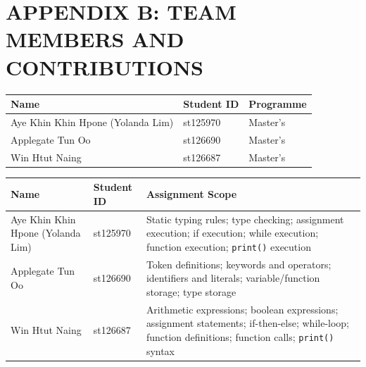 \chapter*{APPENDIX B: TEAM MEMBERS AND CONTRIBUTIONS}

\vspace{1cm}

\begin{table}[h!]
\centering
\renewcommand{\arraystretch}{1.5}
\begin{tabular}{@{} l l l @{}}
\toprule
\textbf{Name} & \textbf{Student ID} & \textbf{Programme} \\
\midrule
Aye Khin Khin Hpone (Yolanda Lim) & st125970 & Master's \\
Applegate Tun Oo                   & st126690 & Master's \\
Win Htut Naing                     & st126687 & Master's \\
\bottomrule
\end{tabular}
\end{table}

\vspace{1cm}

\begin{table}[h!]
\centering
\renewcommand{\arraystretch}{1.5}
\small
\begin{tabular}{@{} p{3.8cm} p{1.8cm} p{8.0cm} @{}}
\toprule
\textbf{Name} & \textbf{Student ID} & \textbf{Assignment Scope} \\
\midrule
Aye Khin Khin Hpone (Yolanda Lim) & st125970 & Static typing rules; type checking; assignment execution; if execution; while execution; function execution; \texttt{print()} execution \\
Applegate Tun Oo & st126690 & Token definitions; keywords and operators; identifiers and literals; variable/function storage; type storage \\
Win Htut Naing & st126687 & Arithmetic expressions; boolean expressions; assignment statements; if-then-else; while-loop; function definitions; function calls; \texttt{print()} syntax \\
\bottomrule
\end{tabular}
\end{table}
